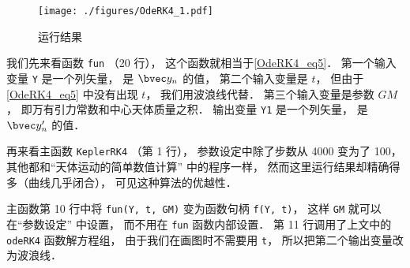 \begin{figure}[ht]
\centering
\texttt{[image: ./figures/OdeRK4\_1.pdf]}
\caption{运行结果} \label{OdeRK4_fig1}
\end{figure}

我们先来看函数 \verb|fun| （20 行）， 这个函数就相当于\autoref{OdeRK4_eq5}． 第一个输入变量 \verb|Y| 是一个列矢量， 是 $\bvec y_n$ 的值， 第二个输入变量是 $t$， 但由于\autoref{OdeRK4_eq5} 中没有出现 $t$， 我们用波浪线代替． 第三个输入变量是参数 $GM$， 即万有引力常数和中心天体质量之积． 输出变量 \verb|Y1| 是一个列矢量， 是 $\bvec y'_n$ 的值．

再来看主函数 \verb|KeplerRK4| （第 1 行）， 参数设定中除了步数从 4000 变为了 100， 其他都和“天体运动的简单数值计算” 中的程序一样， 然而这里运行结果却精确得多（曲线几乎闭合）， 可见这种算法的优越性．

主函数第 10 行中将 \verb|fun(Y, t, GM)| 变为函数句柄 \verb|f(Y, t)|， 这样 \verb|GM| 就可以在“参数设定” 中设置， 而不用在 \verb|fun| 函数内部设置． 第 11 行调用了上文中的 \verb|odeRK4| 函数解方程组， 由于我们在画图时不需要用 \verb|t|， 所以把第二个输出变量改为波浪线．
